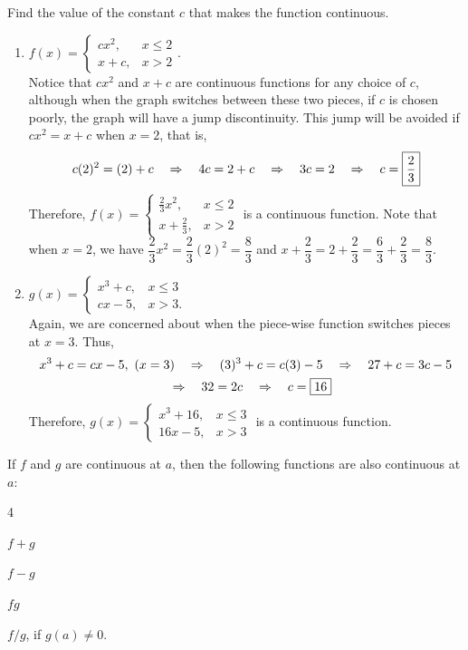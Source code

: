 \documentclass{book}
\begin{document}
\begin{Exam} Find the value of the constant $c$ that makes the function continuous.
\begin{enumerate}
\item $f(x) = \begin{cases} cx^2, & x \le 2\\ x+c, & x> 2\end{cases}$.\\

Notice that $cx^2$ and $x+c$ are continuous functions for any choice of $c$, although when the graph switches between these two pieces, if $c$ is chosen poorly, the graph will have a jump discontinuity. This jump will be avoided if $cx^2=x+c$ when $x=2$, that is, 
\[c(2)^2 = (2)+c \quad\Rightarrow\quad 4c = 2+c \quad\Rightarrow\quad 3c = 2 \quad\Rightarrow\quad c = \fbox{$\dfrac{2}{3}$}\] Therefore, $f(x) = \begin{cases} \frac{2}{3}x^2, & x \le 2\\ x+\frac{2}{3}, & x> 2\end{cases}$ is a continuous function. Note that when $x=2$, we have $\dfrac{2}{3}x^2 = \dfrac{2}{3}(2)^2= \dfrac{8}{3}$ and $x+\dfrac{2}{3} = 2+\dfrac{2}{3} = \dfrac{6}{3} + \dfrac{2}{3} = \dfrac{8}{3}$. \\

\item $g(x) = \begin{cases} x^3+c, & x\le 3\\ cx-5, & x > 3.\end{cases}$\\

Again, we are concerned about when the piece-wise function switches pieces at $x=3$. Thus, 
\begin{multline*}x^3+c = cx-5,\ (x=3) \quad\Rightarrow\quad (3)^3+c = c(3)-5 \quad\Rightarrow\quad 27+c = 3c-5\\ \quad\Rightarrow\quad 32 = 2c \quad\Rightarrow\quad c = \fbox{$16$}\end{multline*}
 Therefore, $g(x) = \begin{cases} x^3+16, & x\le 3\\ 16x-5, & x > 3\end{cases}$ is a continuous function. 
\end{enumerate}
\end{Exam}\vs

\begin{Thm}If $f$ and $g$ are continuous at $a$, then the following functions are also continuous at $a$:\vspace{-15pt}
\begin{enumerate}
\begin{multicols}{4}
\item $f+g$
\item $f-g$
\item $fg$
\item $f/g$, if $g(a) \neq 0$.
\end{multicols}
\end{enumerate}
\end{Thm}
\end{document}
